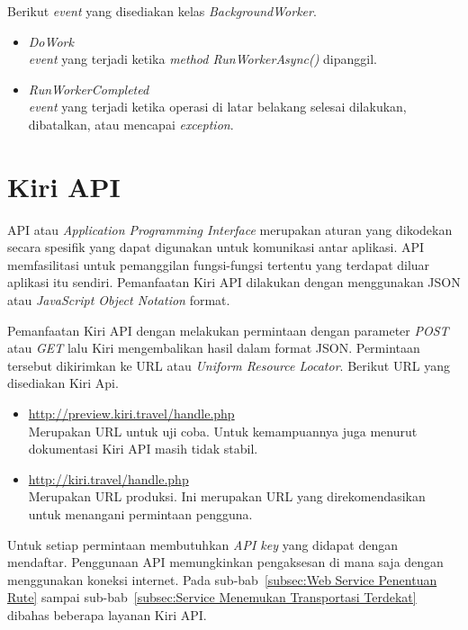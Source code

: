 Berikut \textit{event} yang disediakan kelas \textit{BackgroundWorker}.
\begin{itemize}
	\item \textit{DoWork} \\
	\textit{event} yang terjadi ketika \textit{method RunWorkerAsync()} dipanggil.
	\item \textit{RunWorkerCompleted} \\
	\textit{event} yang terjadi ketika operasi di latar belakang selesai dilakukan, dibatalkan, atau mencapai \textit{exception}.
\end{itemize}

\section{Kiri API}
\label{sec:Kiri API}
\hspace{0.5cm} API atau \textit{Application Programming Interface} merupakan aturan yang dikodekan secara spesifik yang dapat digunakan untuk komunikasi antar aplikasi. API memfasilitasi untuk pemanggilan fungsi-fungsi tertentu yang terdapat diluar aplikasi itu sendiri. Pemanfaatan Kiri API dilakukan dengan menggunakan JSON atau \textit{JavaScript Object Notation} format. 

Pemanfaatan Kiri API dengan melakukan permintaan dengan parameter \textit{POST} atau \textit{GET} lalu Kiri mengembalikan hasil dalam format JSON. Permintaan tersebut dikirimkan ke URL atau \textit{Uniform Resource Locator}. Berikut URL yang disediakan Kiri Api.
\begin{itemize}
	\item \url{http://preview.kiri.travel/handle.php} \\
	Merupakan URL untuk uji coba. Untuk kemampuannya juga menurut dokumentasi Kiri API masih tidak stabil.
	\item \url{http://kiri.travel/handle.php} \\
	Merupakan URL produksi. Ini merupakan URL yang direkomendasikan untuk menangani permintaan pengguna.
\end{itemize}
Untuk setiap permintaan membutuhkan \textit{API key} yang didapat dengan mendaftar\cite{Kiri}. Penggunaan API memungkinkan pengaksesan di mana saja dengan menggunakan koneksi internet. Pada sub-bab~\ref{subsec:Web Service Penentuan Rute} sampai sub-bab~\ref{subsec:Service Menemukan Transportasi Terdekat} dibahas beberapa layanan Kiri API.

